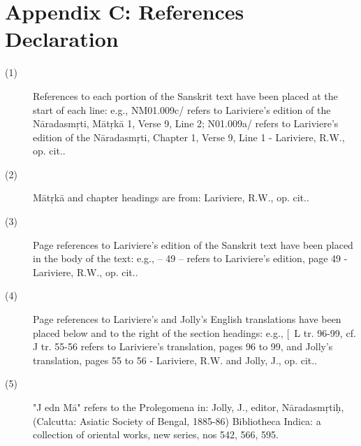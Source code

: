 \documentclass[article,12pt,a4paper]{memoir}%
\begin{document}
\chapter*[{Appendix C: References Declaration}]{Appendix C: References Declaration}\begin{description}

\item[{(1)}]References to each portion of the Sanskrit text have been placed at the start of each line: e.g., NM01.009c/ refers to Lariviere's edition of the Nāradasmṛti, Mātṛkā 1, Verse 9, Line 2; N01.009a/ refers to Lariviere's edition of the Nāradasmṛti, Chapter 1, Verse 9, Line 1 - Lariviere, R.W., op. cit..
\item[{(2)}]Mātṛkā and chapter headings are from: Lariviere, R.W., op. cit..
\item[{(3)}]Page references to Lariviere's edition of the Sanskrit text have been placed in the body of the text: e.g., -- 49 -- refers to Lariviere's edition, page 49 - Lariviere, R.W., op. cit..
\item[{(4)}]Page references to Lariviere's and Jolly's English translations have been placed below and to the right of the section headings: e.g., [ L tr. 96-99, cf. J tr. 55-56 refers to Lariviere's translation, pages 96 to 99, and Jolly's translation, pages 55 to 56 - Lariviere, R.W. and Jolly, J., op. cit..
\item[{(5)}]"J edn Mā" refers to the Prolegomena in: Jolly, J., editor, Nāradasmṛtiḥ, (Calcutta: Asiatic Society of Bengal, 1885-86) Bibliotheca Indica: a collection of oriental works, new series, nos 542, 566, 595.
\end{description} %
     
\end{document}
